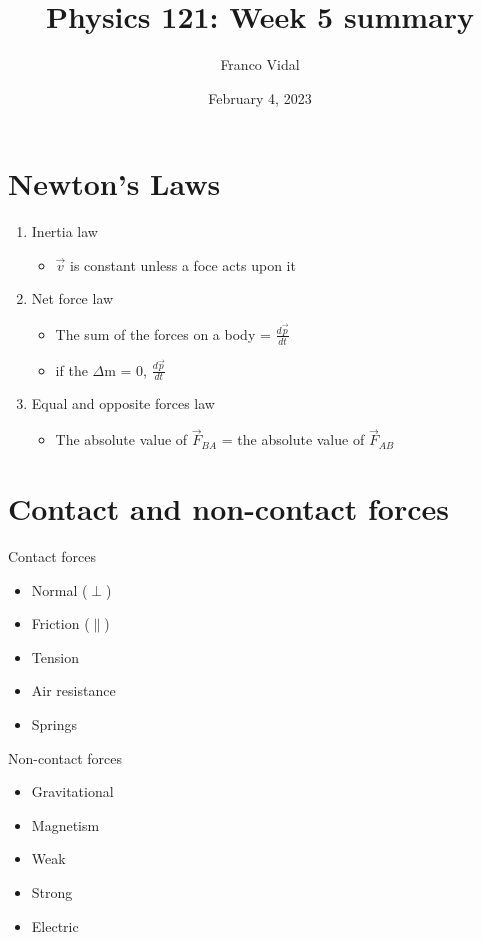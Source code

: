 \documentclass{article}
\title{Physics 121: Week 5 summary}
\author{Franco Vidal}
\date{February 4, 2023}
\begin{document}
\maketitle
\section*{Newton's Laws}
\begin{enumerate}
    \item Inertia law
    \begin{itemize}
        \item $\vec{v}$ is constant unless a foce acts upon it
    \end{itemize}
    \item Net force law
    \begin{itemize}
        \item The sum of the forces on a body = $\frac{d\vec{p}}{dt}$
        \item if the $\Delta$m = 0, $\frac{d\vec{p}}{dt}$ 
    \end{itemize}
    \item Equal and opposite forces law
    \begin{itemize}
        \item The absolute value of $\vec{F}_{BA}$ = the absolute value of $\vec{F}_{AB}$
    \end{itemize}
\end{enumerate}

\section{Contact and non-contact forces}
Contact forces
\begin{minipage}[t]{.25\linewidth}
\begin{itemize}
    \item Normal ($\perp$)
    \item Friction ($\parallel$)
    \item Tension
    \item Air resistance
    \item Springs
\end{itemize}
\end{minipage}\hfill
\begin{minipage}[t]{.6667\linewidth}
Non-contact forces
\begin{itemize}
    \item Gravitational
    \item Magnetism
    \item Weak
    \item Strong
    \item Electric
\end{itemize}
\end{minipage}
\end{document}
